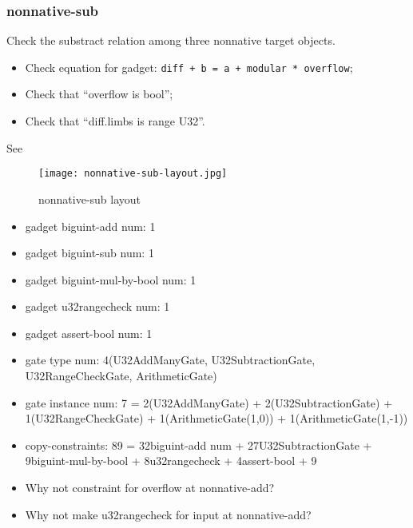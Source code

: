 \subsubsection{nonnative-sub}

Check the substract relation among three nonnative target objects.

\begin{itemize}
    \item Check equation for gadget: \verb|diff + b = a + modular * overflow|;
    \item Check that ``overflow is bool'';
    \item Check that ``diff.limbs is range U32''.
\end{itemize}

See 
\begin{figure}[!ht]
    \centering
    \texttt{[image: nonnative-sub-layout.jpg]}
    \caption{nonnative-sub layout}
    \label{fig:nonnative-sub-layout}
\end{figure}

\begin{itemize}
    \item gadget biguint-add num: 1
    \item gadget biguint-sub num: 1
    \item gadget biguint-mul-by-bool num: 1
    \item gadget u32rangecheck num: 1
    \item gadget assert-bool num: 1
    \item gate type num: 4(U32AddManyGate, U32SubtractionGate, U32RangeCheckGate, ArithmeticGate)
    \item gate instance num: 7 = 2(U32AddManyGate) + 2(U32SubtractionGate) + 1(U32RangeCheckGate) + 1(ArithmeticGate(1,0)) + 1(ArithmeticGate(1,-1))
    \item copy-constraints: 89 = 32{biguint-add num} + 27{U32SubtractionGate} + 9{biguint-mul-by-bool} + 8{u32rangecheck} + 4{assert-bool} + 9
\end{itemize}

\begin{itemize}
    \item Why not constraint for overflow at nonnative-add?
    \item Why not make u32rangecheck for input at nonnative-add?
\end{itemize}
